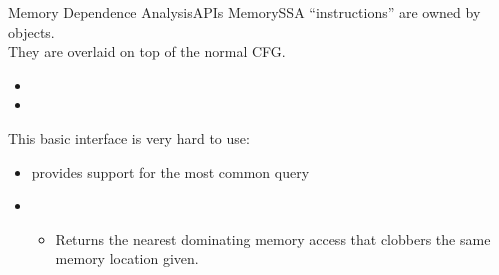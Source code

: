 \begin{frame}{Memory Dependence Analysis}{APIs}
MemorySSA ``instructions'' are owned by  objects.\\
\bigskip
They are \alert{overlaid} on top of the normal CFG. \\
\smallskip
\begin{itemize}
\item {}
\item {}
\end{itemize}
\bigskip
This basic interface is very \alert{hard to use}:\\
\smallskip
\begin{itemize}
\item {} provides support for the most common query
\item {}
\begin{itemize}
\item Returns the nearest dominating memory access that clobbers the
same memory location given.
\end{itemize}
\end{itemize}
\end{frame}

